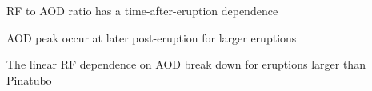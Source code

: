 \documentclass[draft]{agujournal2019}
\begin{document}

\begin{keypoints}
  \item RF to AOD ratio has a time-after-eruption dependence
  \item AOD peak occur at later post-eruption for larger eruptions
  \item The linear RF dependence on AOD break down for eruptions larger than Pinatubo
\end{keypoints}


%
%

%
%

\end{document}
